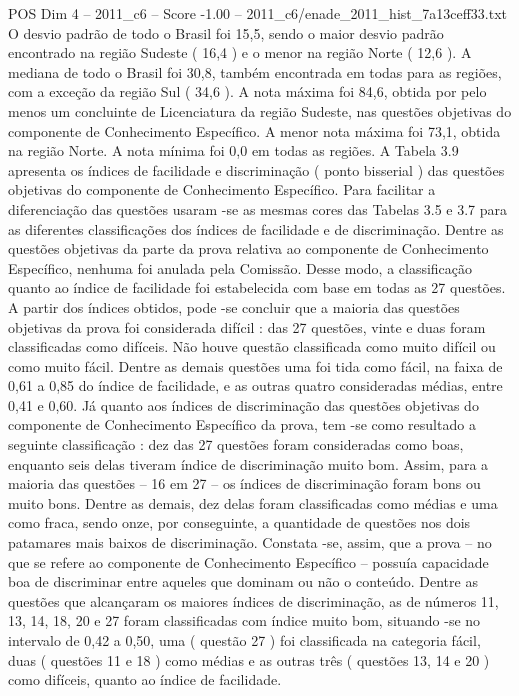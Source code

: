 \begin{textsample}{POS Dim 4 – 2011\_c6 – Score -1.00 – 2011\_c6/enade\_2011\_hist\_7a13ceff33.txt}
O desvio padrão de todo o Brasil foi 15,5, sendo o maior desvio padrão encontrado na região Sudeste ( 16,4 ) e o menor na região Norte ( 12,6 ).
A mediana de todo o Brasil foi 30,8, também encontrada em todas para as regiões, com a exceção da região Sul ( 34,6 ).
A nota máxima foi 84,6, obtida por pelo menos um concluinte de Licenciatura da região Sudeste, nas questões objetivas do componente de Conhecimento Específico.
A menor nota máxima foi 73,1, obtida na região Norte.
A nota mínima foi 0,0 em todas as regiões.
A Tabela 3.9 apresenta os índices de facilidade e discriminação ( ponto bisserial ) das questões objetivas do componente de Conhecimento Específico.
Para facilitar a diferenciação das questões usaram -se as mesmas cores das Tabelas 3.5 e 3.7 para as diferentes classificações dos índices de facilidade e de discriminação.
Dentre as questões objetivas da parte da prova relativa ao componente de Conhecimento Específico, nenhuma foi anulada pela Comissão.
Desse modo, a classificação quanto ao índice de facilidade foi estabelecida com base em todas as 27 questões.
A partir dos índices obtidos, pode -se concluir que a maioria das questões objetivas da prova foi considerada difícil : das 27 questões, vinte e duas foram classificadas como difíceis.
Não houve questão classificada como muito difícil ou como muito fácil.
Dentre as demais questões uma foi tida como fácil, na faixa de 0,61 a 0,85 do índice de facilidade, e as outras quatro consideradas médias, entre 0,41 e 0,60.
Já quanto aos índices de discriminação das questões objetivas do componente de Conhecimento Específico da prova, tem -se como resultado a seguinte classificação : dez das 27 questões foram consideradas como boas, enquanto seis delas tiveram índice de discriminação muito bom.
Assim, para a maioria das questões – 16 em 27 – os índices de discriminação foram bons ou muito bons.
Dentre as demais, dez delas foram classificadas como médias e uma como fraca, sendo onze, por conseguinte, a quantidade de questões nos dois patamares mais baixos de discriminação.
Constata -se, assim, que a prova – no que se refere ao componente de Conhecimento Específico – possuía capacidade boa de discriminar entre aqueles que dominam ou não o conteúdo.
Dentre as questões que alcançaram os maiores índices de discriminação, as de números 11, 13, 14, 18, 20 e 27 foram classificadas com índice muito bom, situando -se no intervalo de 0,42 a 0,50, uma ( questão 27 ) foi classificada na categoria fácil, duas ( questões 11 e 18 ) como médias e as outras três ( questões 13, 14 e 20 ) como difíceis, quanto ao índice de facilidade.

\end{textsample}
